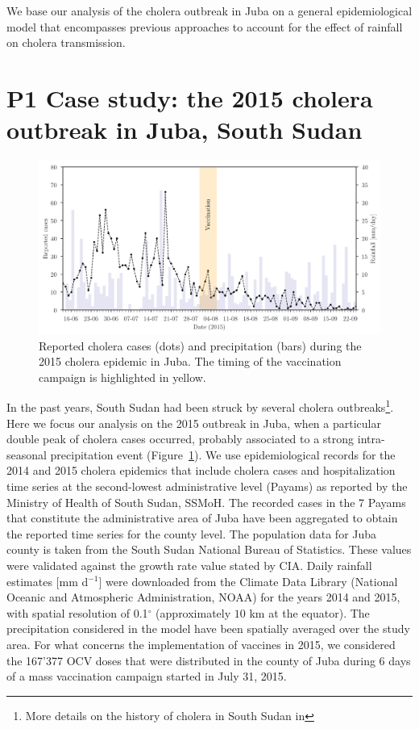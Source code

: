 We base our analysis of the cholera outbreak in Juba on a general epidemiological model that encompasses previous approaches to account for the effect of rainfall on cholera transmission. %


\section{P1 Case study: the 2015 cholera outbreak in Juba, South Sudan}\label{sec:data sets}
\begin{figure}\centering
  \includegraphics[width=\textwidth]{fig_cholera-rainfall/Lemaitre_ACTROP_2018_42_R1_fig2.png}
  \caption[Cholera cases and precipitation during the 2015 epidemic in Juba]{Reported cholera cases (dots) and precipitation (bars) during the 2015 cholera epidemic in Juba. The timing of the vaccination campaign is highlighted in yellow.}
  \label{fig:report}
\end{figure}
In the past years, South Sudan had been struck by several cholera outbreaks\footnote{More details on the history of cholera in South Sudan in }. Here we focus our analysis on the 2015 outbreak in Juba, when a particular double peak of cholera cases occurred, probably associated to a strong intra-seasonal precipitation event (Figure~\ref{fig:report}). We use epidemiological records for the 2014 and 2015 cholera epidemics that include cholera cases and hospitalization time series at the second-lowest administrative level  (Payams) as reported by the Ministry of Health of South Sudan, SSMoH. The recorded cases in the 7 Payams that constitute the administrative area of Juba have been aggregated to obtain the reported time series for the county level. The population data for Juba county is taken from the South Sudan National Bureau of Statistics\cite{SSNBS:PopulationProjectionsSouth:2015}.
These values were validated against the growth rate value stated by CIA\cite{CIA:SouthSudan:2015}. Daily rainfall estimates [mm d$^{-1}$] were downloaded from the Climate Data Library (National Oceanic and Atmospheric Administration, NOAA)\cite{IRI/LDEO:ClimateDataLibrary:2016} for the years 2014 and 2015, with spatial resolution of {0.1}$^\circ$ (approximately $10$ km at the equator). The precipitation considered in the model have been spatially averaged over the study area. For what concerns the implementation of vaccines in 2015, we considered the 167'377 OCV doses that were distributed in the county of Juba\cite{Abubakar:FirstUseGlobal:2015,Azman:EffectivenessOneDose:2016,Parker:AdaptingGlobalShortage:2017} during 6 days of a mass vaccination campaign started in July 31, 2015.
